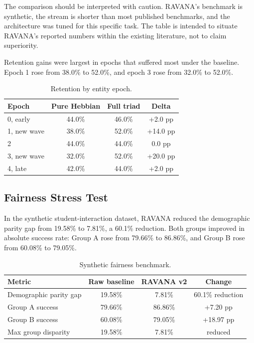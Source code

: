 \documentclass[11pt]{article}
\begin{document}
The comparison should be interpreted with caution. RAVANA's benchmark is synthetic, the stream is shorter than most published benchmarks, and the architecture was tuned for this specific task. The table is intended to situate RAVANA's reported numbers within the existing literature, not to claim superiority.

Retention gains were largest in epochs that suffered most under the baseline. Epoch 1 rose from 38.0\% to 52.0\%, and epoch 3 rose from 32.0\% to 52.0\%.

\begin{table}[h]
\centering
\caption{Retention by entity epoch.}
\begin{tabular}{lccc}
\toprule
Epoch & Pure Hebbian & Full triad & Delta \\
\midrule
0, early & 44.0\% & 46.0\% & +2.0 pp \\
1, new wave & 38.0\% & 52.0\% & +14.0 pp \\
2 & 44.0\% & 44.0\% & 0.0 pp \\
3, new wave & 32.0\% & 52.0\% & +20.0 pp \\
4, late & 42.0\% & 44.0\% & +2.0 pp \\
\bottomrule
\end{tabular}
\end{table}

\subsection{Fairness Stress Test}
In the synthetic student-interaction dataset, RAVANA reduced the demographic parity gap from 19.58\% to 7.81\%, a 60.1\% reduction. Both groups improved in absolute success rate: Group A rose from 79.66\% to 86.86\%, and Group B rose from 60.08\% to 79.05\%.

\begin{table}[h]
\centering
\caption{Synthetic fairness benchmark.}
\begin{tabular}{lccc}
\toprule
Metric & Raw baseline & RAVANA v2 & Change \\
\midrule
Demographic parity gap & 19.58\% & 7.81\% & 60.1\% reduction \\
Group A success & 79.66\% & 86.86\% & +7.20 pp \\
Group B success & 60.08\% & 79.05\% & +18.97 pp \\
Max group disparity & 19.58\% & 7.81\% & reduced \\
\bottomrule
\end{tabular}
\end{table}
\end{document}
